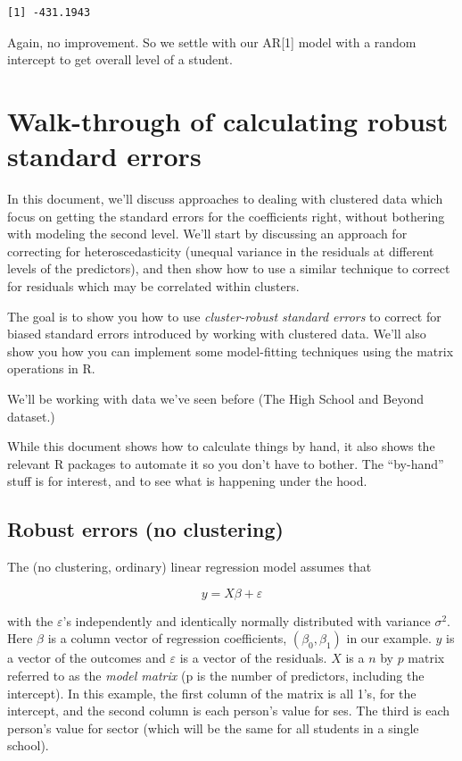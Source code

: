\documentclass[
  letterpaper,
  DIV=11,
  numbers=noendperiod]{scrreprt}
\begin{document}
\begin{verbatim}
[1] -431.1943
\end{verbatim}

Again, no improvement. So we settle with our AR{[}1{]} model with a
random intercept to get overall level of a student.

\chapter{Walk-through of calculating robust standard
errors}\label{walk-through-of-calculating-robust-standard-errors}

In this document, we'll discuss approaches to dealing with clustered
data which focus on getting the standard errors for the coefficients
right, without bothering with modeling the second level. We'll start by
discussing an approach for correcting for heteroscedasticity (unequal
variance in the residuals at different levels of the predictors), and
then show how to use a similar technique to correct for residuals which
may be correlated within clusters.

The goal is to show you how to use \emph{cluster-robust standard errors}
to correct for biased standard errors introduced by working with
clustered data. We'll also show you how you can implement some
model-fitting techniques using the matrix operations in R.

We'll be working with data we've seen before (The High School and Beyond
dataset.)

While this document shows how to calculate things by hand, it also shows
the relevant R packages to automate it so you don't have to bother. The
``by-hand'' stuff is for interest, and to see what is happening under
the hood.

\section{Robust errors (no
clustering)}\label{robust-errors-no-clustering}

The (no clustering, ordinary) linear regression model assumes that

\[y = X\beta + \varepsilon\]

with the \(\varepsilon\)'s independently and identically normally
distributed with variance \(\sigma^2\). Here \(\beta\) is a column
vector of regression coefficients, \((\beta_0, \beta_1)\) in our
example. \(y\) is a vector of the outcomes and \(\varepsilon\) is a
vector of the residuals. \(X\) is a \(n\) by \(p\) matrix referred to as
the \emph{model matrix} (p is the number of predictors, including the
intercept). In this example, the first column of the matrix is all 1's,
for the intercept, and the second column is each person's value for ses.
The third is each person's value for sector (which will be the same for
all students in a single school).
\end{document}

